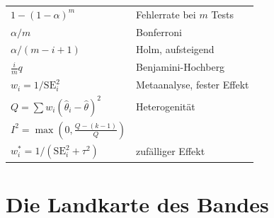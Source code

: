 \begin{merksatz}
\begin{center}
{\small
\renewcommand{\arraystretch}{1.6}
\begin{tabular}{@{}P{4.4cm}P{4.2cm}@{}}
\toprule
$1-(1-\alpha)^m$ & Fehlerrate bei $m$ Tests\\
$\alpha/m$ & Bonferroni\\
$\alpha/(m-i+1)$ & Holm, aufsteigend\\
$\frac{i}{m}q$ & Benjamini-Hochberg\\
$w_i = 1/\mathrm{SE}_i^2$ & Metaanalyse, fester Effekt\\
$Q = \sum w_i(\hat\theta_i - \hat\theta)^2$ & Heterogenität\\
$I^2 = \max(0, \frac{Q-(k-1)}{Q})$ & \\
$w_i^{*} = 1/(\mathrm{SE}_i^2+\tau^2)$ & zufälliger Effekt\\
\bottomrule
\end{tabular}}
\end{center}
\end{merksatz}

\section{Die Landkarte des Bandes}

